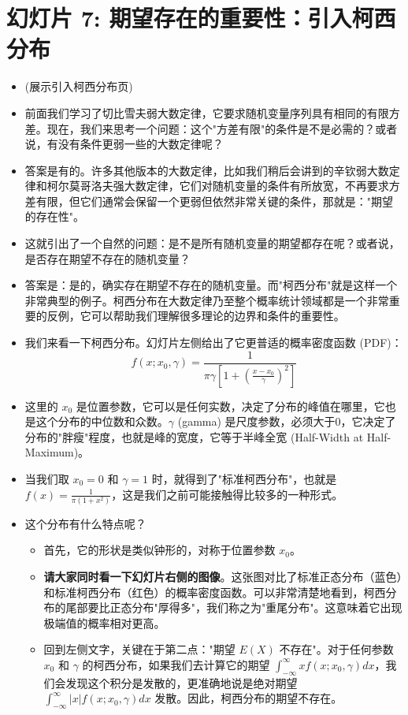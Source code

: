 \documentclass[UTF8]{article} %
\begin{document}
\section*{幻灯片 7: 期望存在的重要性：引入柯西分布}
\begin{itemize}
    \itemsep1em
    \item (展示引入柯西分布页)
    \item 前面我们学习了切比雪夫弱大数定律，它要求随机变量序列具有相同的有限方差。现在，我们来思考一个问题：这个"方差有限"的条件是不是必需的？或者说，有没有条件更弱一些的大数定律呢？
    \item 答案是有的。许多其他版本的大数定律，比如我们稍后会讲到的辛钦弱大数定律和柯尔莫哥洛夫强大数定律，它们对随机变量的条件有所放宽，不再要求方差有限，但它们通常会保留一个更弱但依然非常关键的条件，那就是："期望的存在性"。
    \item 这就引出了一个自然的问题：是不是所有随机变量的期望都存在呢？或者说，是否存在期望不存在的随机变量？
    \item 答案是：是的，确实存在期望不存在的随机变量。而"柯西分布"就是这样一个非常典型的例子。柯西分布在大数定律乃至整个概率统计领域都是一个非常重要的反例，它可以帮助我们理解很多理论的边界和条件的重要性。
    \item 我们来看一下柯西分布。幻灯片左侧给出了它更普适的概率密度函数 (PDF)：
    \[ f(x; x_0, \gamma) = \frac{1}{\pi\gamma \left[1 + \left(\frac{x-x_0}{\gamma}\right)^2\right]} \]
    \item 这里的 $x_0$ 是位置参数，它可以是任何实数，决定了分布的峰值在哪里，它也是这个分布的中位数和众数。$\gamma$ (gamma) 是尺度参数，必须大于0，它决定了分布的"胖瘦"程度，也就是峰的宽度，它等于半峰全宽 (Half-Width at Half-Maximum)。
    \item 当我们取 $x_0=0$ 和 $\gamma=1$ 时，就得到了"标准柯西分布"，也就是 $f(x) = \frac{1}{\pi (1+x^2)}$，这是我们之前可能接触得比较多的一种形式。
    \item 这个分布有什么特点呢？
    \begin{itemize}[label=\textbullet, itemsep=0.3em]
        \item 首先，它的形状是类似钟形的，对称于位置参数 $x_0$。
        \item \textbf{请大家同时看一下幻灯片右侧的图像}。这张图对比了标准正态分布（蓝色）和标准柯西分布（红色）的概率密度函数。可以非常清楚地看到，柯西分布的尾部要比正态分布"厚得多"，我们称之为"重尾分布"。这意味着它出现极端值的概率相对更高。
        \item 回到左侧文字，关键在于第二点："期望 $E(X)$ 不存在"。对于任何参数 $x_0$ 和 $\gamma$ 的柯西分布，如果我们去计算它的期望 $\int_{-\infty}^{\infty} x f(x; x_0, \gamma) dx$，我们会发现这个积分是发散的，更准确地说是绝对期望 $\int_{-\infty}^{\infty} |x| f(x; x_0, \gamma) dx$ 发散。因此，柯西分布的期望不存在。

\end{itemize}
\end{itemize}
\end{document}
